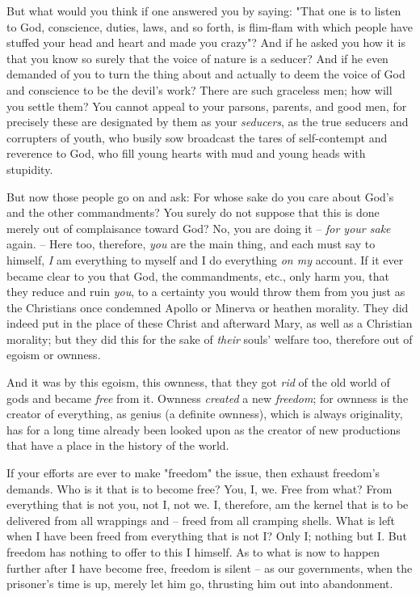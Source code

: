\documentclass[a4paper]{book}
\begin{document}
But what would you think if one answered you by saying: "{}That one is to 
listen to God, conscience, duties, laws, and so forth, is flim-flam with which 
people have stuffed your head and heart and made you crazy"{}? And if he asked 
you how it is that you know so surely that the voice of nature is a seducer? 
And if he even demanded of you to turn the thing about and actually to deem 
the voice of God and conscience to be the devil's work? There are such 
graceless men; how will you settle them? You cannot appeal to your parsons, 
parents, and good men, for precisely these are designated by them as your 
\textit{seducers}, as the true seducers and corrupters of youth, who busily 
sow broadcast the tares of self-contempt and reverence to God, who fill young 
hearts with mud and young heads with stupidity.

But now those people go on and ask: For whose sake do you care about God's and 
the other commandments? You surely do not suppose that this is done merely out 
of complaisance toward God? No, you are doing it -- \textit{for your sake} 
again. -- Here too, therefore, \textit{you} are the main thing, and each must 
say to himself, \textit{I} am everything to myself and I do everything 
\textit{on my} account. If it ever became clear to you that God, the 
commandments, etc., only harm you, that they reduce and ruin \textit{you}, to 
a certainty you would throw them from you just as the Christians once 
condemned Apollo or Minerva or heathen morality. They did indeed put in the 
place of these Christ and afterward Mary, as well as a Christian morality; but 
they did this for the sake of \textit{their} souls' welfare too, therefore out 
of egoism or ownness.

And it was by this egoism, this ownness, that they got \textit{rid} of the old 
world of gods and became \textit{free} from it. Ownness \textit{created} a new 
\textit{freedom}; for ownness is the creator of everything, as genius (a 
definite ownness), which is always originality, has for a long time already 
been looked upon as the creator of new productions that have a place in the 
history of the world.

If your efforts are ever to make "{}freedom"{} the issue, then exhaust 
freedom's demands. Who is it that is to become free? You, I, we. Free from 
what? From everything that is not you, not I, not we. I, therefore, am the 
kernel that is to be delivered from all wrappings and -- freed from all 
cramping shells. What is left when I have been freed from everything that is 
not I? Only I; nothing but I. But freedom has nothing to offer to this I 
himself. As to what is now to happen further after I have become free, freedom 
is silent -- as our governments, when the prisoner's time is up, merely let 
him go, thrusting him out into abandonment.
\end{document}
